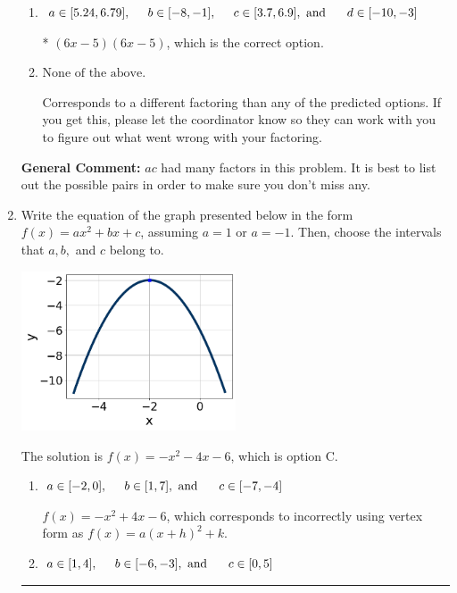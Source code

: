 \documentclass{extbook}[14pt]
\newcommand{\litem}[1]{\item #1

\rule{\textwidth}{0.4pt}}
\begin{document}
\begin{enumerate}
{\begin{enumerate}[label=\Alph*.]
 $(12x -5)(3x -5)$, which corresponds to associating some factor of a to c.
\item \( a \in [5.24, 6.79], \hspace*{5mm} b \in [-8, -1], \hspace*{5mm} c \in [3.7, 6.9], \text{ and } \hspace*{5mm} d \in [-10, -3] \)

* $(6x -5)(6x -5)$, which is the correct option.
\item \( \text{None of the above.} \)

 Corresponds to a different factoring than any of the predicted options. If you get this, please let the coordinator know so they can work with you to figure out what went wrong with your factoring.
\end{enumerate}

\textbf{General Comment:} $ac$ had many factors in this problem. It is best to list out the possible pairs in order to make sure you don't miss any.
}
\litem{
Write the equation of the graph presented below in the form $f(x)=ax^2+bx+c$, assuming  $a=1$ or $a=-1$. Then, choose the intervals that $a, b,$ and $c$ belong to.

\begin{center}
    \includegraphics[width=0.5\textwidth]{../Figures/quadraticGraphToEquationCopyB.png}
\end{center}


The solution is \( f(x) = -x^{2} -4 x -6 \), which is option C.\begin{enumerate}[label=\Alph*.]
\item \( a \in [-2, 0], \hspace*{5mm} b \in [1, 7], \text{ and } \hspace*{5mm} c \in [-7, -4] \)

$f(x)=-x^{2} +4 x -6$, which corresponds to incorrectly using vertex form as $f(x) = a(x+h)^2+k$.
\item \( a \in [1, 4], \hspace*{5mm} b \in [-6, -3], \text{ and } \hspace*{5mm} c \in [0, 5] \)


\end{enumerate}}
\end{enumerate}
\end{document}
